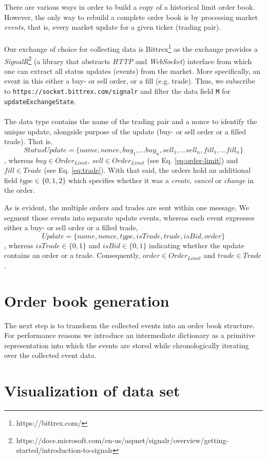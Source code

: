 There are various ways in order to build a copy of a historical limit order book. However, the only way to rebuild a complete order book is by processing market \textit{events}, that is, every market update for a given ticker (trading pair).
\\
\\
Our exchange of choice for collecting data is Bittrex\footnote{https://bittrex.com/} as the exchange provides a \textit{SignalR}\footnote{https://docs.microsoft.com/en-us/aspnet/signalr/overview/getting-started/introduction-to-signalr} (a library that abstracts \textit{HTTP} and \textit{WebSocket}) interface from which one can extract all status updates (events) from the market.
More specifically, an event in this either a buy- or sell order, or a fill (e.g. trade).
Thus, we subscribe to \texttt{https://socket.bittrex.com/signalr} and filter the data field \texttt{M} for \texttt{updateExchangeState}.
\\
\\
The data type contains the name of the trading pair and a nonce to identify the unique update, alongside purpose of the update (buy- or sell order or a filled trade).
That is,
\begin{equation}
    StatusUpdate = \{name, nonce, buy_1,...buy_n, sell_1,...sell_n, fill_1,...fill_n\}
\end{equation}
, whereas $buy \in Order_{Limit}$, $sell \in Order_{Limit}$ (see Eq. \ref{eq:order-limit}) and $fill \in Trade$ (see Eq. \ref{eq:trade}).
With that said, the orders hold an additional field $type \in \{0,1,2\}$ which specifies whether it was a \textit{create}, \textit{cancel} or \textit{change} in the order.

As is evident, the multiple orders and trades are sent within one message. 
We segment those events into separate update events, whereas each event expresses either a buy- or sell order or a filled trade,
\begin{equation}
    Update = \{name, nonce, type, isTrade, trade, isBid, order\}
\end{equation}
, whereas $isTrade \in \{0,1\}$ and $isBid \in \{0,1\}$ indicating whether the update contains an order or a trade. 
Consequently, $order \in Order_{Limit}$ and $trade \in Trade$.


\section{Order book generation}

The next step is to transform the collected events into an order book structure.
For performance reasons we introduce an intermediate dictionary as a primitive representation into which the events are stored while chronologically iterating over the collected event data.

\section{Visualization of data set}

